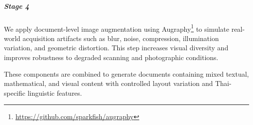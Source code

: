 \documentclass[]{typhoon} %
\begin{document}
\subparagraph{Stage 4} We apply document-level image augmentation using Augraphy\footnote{\url{https://github.com/sparkfish/augraphy}} \citep{augraphy_paper} to simulate real-world acquisition artifacts such as blur, noise, compression, illumination variation, and geometric distortion. This step increases visual diversity and improves robustness to degraded scanning and photographic conditions.

These components are combined to generate documents containing mixed textual, mathematical, and visual content with controlled layout variation and Thai-specific linguistic features.


    
    
    
    
    
\end{document}

